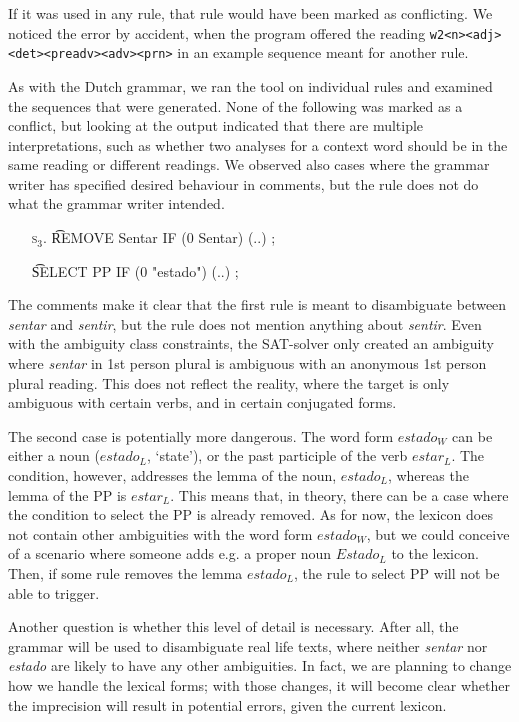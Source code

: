 If it was used in any rule, that rule would have been marked as
conflicting. We noticed the error by accident, when the program
offered the reading \texttt{w2<n><adj><det><preadv><adv><prn>}
in an example sequence meant for another rule.


As with the Dutch grammar, we ran the tool on individual rules and
examined the sequences that were generated. None of the following was
marked as a conflict, but looking at the output indicated that there
are multiple interpretations, such as whether two analyses for a
context word should be in the same reading or different readings.
We observed also cases where the grammar writer has specified desired
behaviour in comments, but the rule does not do what the grammar
writer intended. 

\begin{itemize}
\item[\textsc{s$_3$.}] \t{REMOVE Sentar IF (0 Sentar) (..) ;}
\item[] \t{SELECT PP IF (0 "estado") (..) ;}
\end{itemize}

The comments make it clear that the first rule is meant to disambiguate between \emph{sentar} and \emph{sentir}, but the rule does not mention anything about \emph{sentir}.
Even with the ambiguity class constraints, the SAT-solver only created an ambiguity where \emph{sentar} in 1st person plural is ambiguous with an anonymous 1st person plural reading.
This does not reflect the reality, where the target is only ambiguous with certain verbs, and in certain conjugated forms.

The second case is potentially more dangerous. 
The word form $estado_{W}$ 
can be either a noun ($estado_{L}$, `state'), or the past participle of the verb $estar_{L}$. 
The condition, however, addresses the lemma of the noun, $estado_L$, whereas the lemma of the PP is $estar_{L}$.
This means that, in theory, there can be a case where the condition to select the PP is already removed. As for now, the lexicon does not contain other ambiguities with the word form $estado_{W}$, but we could conceive of a scenario where someone adds e.g. a proper noun $Estado_{L}$ to the lexicon. Then, if some rule removes the lemma $estado_{L}$, the rule to select PP will not be able to trigger.


Another question is whether this level of detail is necessary. 
After all, the grammar will be used to disambiguate real life texts, where neither \emph{sentar} nor \emph{estado} are likely to have any other ambiguities.
In fact, we are planning to change how we handle the lexical forms; with those changes, it will become clear whether the imprecision will result in potential errors, given the current lexicon. 





